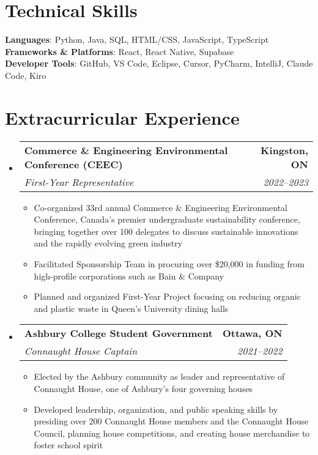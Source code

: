 \documentclass[letterpaper,10pt]{article}
\makeatletter
\newcommand{\resumeItem}[1]{
  \item\small{
    {#1 \vspace{-2pt}}
  }
}
\newcommand{\resumeSubheading}[4]{
  \vspace{-2pt}\item
    \begin{tabular*}{1.0\textwidth}[t]{l@{\extracolsep{\fill}}r}
      \textbf{#1} & \textbf{\small #2} \\
      \textit{\small#3} & \textit{\small #4} \\
    \end{tabular*}\vspace{-7pt}
}
\newcommand{\resumeSubHeadingListStart}{\begin{itemize}[leftmargin=0.0in, label={}]}
\newcommand{\resumeSubHeadingListEnd}{\end{itemize}}
\newcommand{\resumeItemListStart}{\begin{itemize}[label=--]}
\newcommand{\resumeItemListEnd}{\end{itemize}\vspace{-5pt}}
\makeatother
\begin{document}
%
\section{Technical Skills}
 \begin{itemize}[leftmargin=0.15in, label={}]
    \small{\item{
     \textbf{Languages}{: Python, Java, SQL, HTML/CSS, JavaScript, TypeScript} \\
     \textbf{Frameworks \& Platforms}{: React, React Native, Supabase} \\
     \textbf{Developer Tools}{: GitHub, VS Code, Eclipse, Cursor, PyCharm, IntelliJ, Claude Code, Kiro} \\
    }}
 \end{itemize}
 \vspace{-16pt}

\section{Extracurricular Experience}
    \resumeSubHeadingListStart
      \resumeSubheading
        {Commerce \& Engineering Environmental Conference (CEEC)}{Kingston, ON}
        {First-Year Representative}{2022--2023}
        \resumeItemListStart
            \resumeItem{Co-organized 33rd annual Commerce \& Engineering Environmental Conference, Canada's premier undergraduate sustainability conference, bringing together over 100 delegates to discuss sustainable innovations and the rapidly evolving green industry}
            \resumeItem{Facilitated Sponsorship Team in procuring over \$20,000 in funding from high-profile corporations such as Bain \& Company}
            \resumeItem{Planned and organized First-Year Project focusing on reducing organic and plastic waste in Queen's University dining halls}
        \resumeItemListEnd
      \resumeSubheading
        {Ashbury College Student Government}{Ottawa, ON}
        {Connaught House Captain}{2021--2022}
        \resumeItemListStart
            \resumeItem{Elected by the Ashbury community as leader and representative of Connaught House, one of Ashbury's four governing houses}
            \resumeItem{Developed leadership, organization, and public speaking skills by presiding over 200 Connaught House members and the Connaught House Council, planning house competitions, and creating house merchandise to foster school spirit}
        \resumeItemListEnd
    \resumeSubHeadingListEnd
\end{document}
